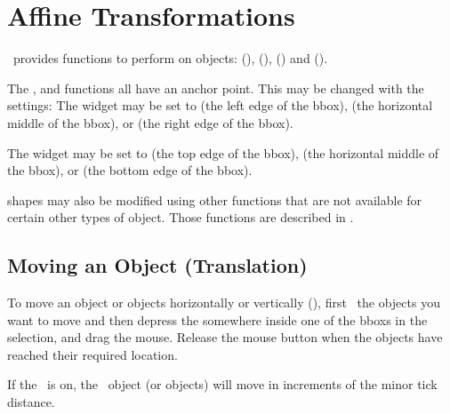 \chapter{Affine Transformations}\label{sec:affinetrans}

\FlowframTk\ provides functions to perform 
 on \glspl{object}:
 (), 
 (), 
 () and 
 ().

The ,  and
 functions all have an anchor point.
This may be changed with the  settings:
The  widget may be set to
 (the left edge of the \gls{bbox}),
 (the horizontal middle of the \gls{bbox}), or
 (the right edge of the \gls{bbox}).

The  widget may be set to
 (the top edge of the \gls{bbox}),
 (the horizontal middle of the \gls{bbox}), or
 (the bottom edge of the \gls{bbox}).

\Glspl{shape} may also be modified using other functions
that are not available for certain other types of \gls{object}. Those
functions are described in .

\section{Moving an Object (Translation)}\label{sec:moveobjects}

To move an \gls{object} or \glspl*{object} horizontally or
vertically (), first \select\ the
\glspl*{object} you want to move and then depress the
 somewhere inside 
one of the \glspl{bbox} in the selection, and drag the mouse. 
Release the mouse button when the
\glspl*{object} have reached their required location.

\begin{important}
If the \gridlock\ is on, the \selected\
\gls{object} (or \glspl{object}) will move
in increments of the minor tick distance.
\end{important}

